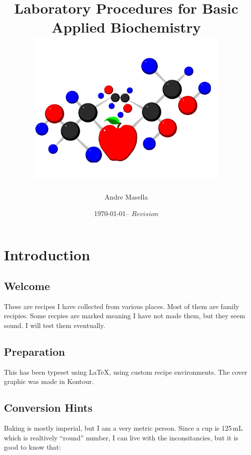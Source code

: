 \documentclass{book}
\begin{document}
\title{Laboratory Procedures for Basic Applied Biochemistry \\
\includegraphics[width=10cm]{CoverLogo} 
}
\author{ Andre Masella }
\date{\today -- $Revision$}
\maketitle

\tableofcontents

\chapter{ Introduction }

\section { Welcome }

These are recipes I have collected from various places. Most of them are
family recipies. Some recpies are marked \UNTESTED meaning I have not
made them, but they seem sound.  I will test them eventually.\par

\section { Preparation }

This has been typeset using \LaTeX{}, using custom recipe environments.
The cover graphic was made in Kontour.\par

\section { Conversion Hints }

Baking is mostly imperial, but I am a very metric person. Since a cup is
125\,mL which is realtively ``round'' number, I can live with the
inconsitancies, but it is good to know that: \par
\end{document}
